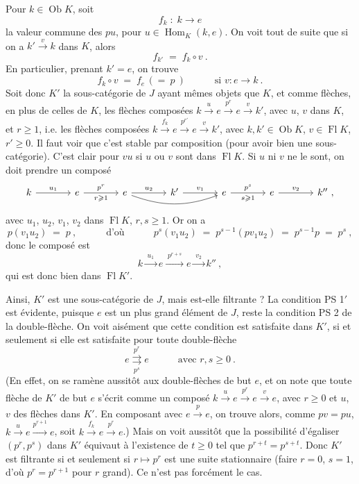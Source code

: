 \documentclass[11pt]{article}
\newcommand{\printedpage}[1]{\marginpar{\footnotesize p.~#1}}
\newcommand{\msp}[1]{\marginpar{\footnotesize [#1]}}
\newcommand{\Ob}{\operatorname{Ob}}
\newcommand{\Fl}{\operatorname{Fl}}
\newcommand{\Hom}{\operatorname{Hom}}
\begin{document}
Pour $k \in \Ob K$, soit
\[ f_k \;:\; k \longrightarrow e \]
la valeur commune des $pu$, pour $u \in \Hom_K(k,e)$. On voit tout de suite que si on a $k' \xrightarrow{v} k$ dans $K$, alors
\[ f_{k'} \;=\; f_k \circ v \ . \]
\printedpage{138}
En particulier, prenant $k' = e$, on trouve
\[ f_k \circ v \;=\; f_e \,(=\ p\ ) \qquad\quad \text{si } v : e \longrightarrow k \ . \]
Soit donc $K'$ la sous-catégorie de $J$ ayant mêmes objets que $K$, et comme flèches, en plus de celles de $K$, les flèches composées $k \xrightarrow{u} e \xrightarrow{p^r} e \xrightarrow{v} k'$, avec $u$, $v$ dans $K$, et $r \geqslant 1$, i.e. les flèches composées $k \xrightarrow{f_k} e \xrightarrow{p^{r'}} e \xrightarrow{v} k'$, avec $k, k' \in \Ob K$, $v \in \Fl K$, $r' \geqslant 0$. Il faut voir que c'est stable par composition (pour avoir bien une sous-catégorie). C'est clair pour $vu$ si $u$ ou $v$ sont dans $\Fl K$. Si $u$ ni $v$ ne le sont, on doit prendre un composé
\[
\begin{tikzcd}[column sep=large]
k \arrow[r, "u_1"] & e \arrow[r, "p^r", "r\geqslant 1"'] & e \arrow[r, "u_2"] \arrow[rr, bend right=20] & k' \arrow[r, "v_1"] & e \arrow[r, "p^s", "s\geqslant 1"'] & e \arrow[r, "v_2"] & k'' \ ,
\end{tikzcd}
\]
avec $u_1$, $u_2$, $v_1$, $v_2$ dans $\Fl K$, $r, s \geqslant 1$. Or on a
\[ p(v_1u_2) \;=\; p \ , \qquad\quad \text{d'où} \qquad\quad p^s(v_1u_2) \;=\; p^{s-1}(pv_1u_2) \;=\; p^{s-1}p \;=\; p^s \ , \]
donc le composé est
\[ k \xrightarrow{\;u_1\;} e \xrightarrow{\;p^{r+s}\;} e \xrightarrow{\;v_2\;} k'' \ , \]
qui
\msp{page 365}
est donc bien dans $\Fl K'$.

Ainsi, $K'$ est une sous-catégorie de $J$, mais est-elle filtrante ? La condition PS 1$'$ est évidente, puisque $e$ est un plus grand élément de $J$, reste la condition PS 2 de la double-flèche. On voit aisément que cette condition est satisfaite dans $K'$, si et seulement si elle est satisfaite pour toute double-flèche
\[ e \overset{p^r}{\underset{p^s}{\rightrightarrows}} e \qquad\quad \text{avec } r, s \geqslant 0 \ . \]
(En effet, on se ramène aussitôt aux double-flèches de but $e$, et on note que toute flèche de $K'$ de but $e$ s'écrit comme un composé $k \xrightarrow{u} e \xrightarrow{p^r} e \xrightarrow{v} e$, avec $r \geqslant 0$ et $u$, $v$ des flèches dans $K'$. En composant avec $e \xrightarrow{p} e$, on trouve alors, comme $pv = pu$, $k \xrightarrow{u} e \xrightarrow{p^{r+1}} e$, soit $k \xrightarrow{f_k} e \xrightarrow{p^r} e$.) Mais on voit aussitôt que la possibilité d'égaliser $(p^r, p^s)$ dans $K'$ équivaut à l'existence de $t \geqslant 0$ tel que $p^{r+t} = p^{s+t}$. Donc $K'$ est filtrante si et seulement si $r \longmapsto p^r$ est une suite stationnaire (faire $r = 0$, $s = 1$, d'où $p^r = p^{r+1}$ pour $r$ grand). Ce n'est
\msp{page 366}
pas forcément le cas.
\end{document}

